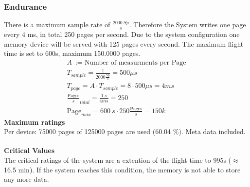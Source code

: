 \subsubsection{Endurance}
There is a maximum sample rate of $\frac{2000 ~Sp}{s}$. Therefore the System writes one page every 4 ms, in total 250 pages per second. Due to the system configuration one memory device will be served with 125 pages every second. The maximum flight time is set to 600s, maximum 150.0000 pages. 
\begin{equation}
	\begin{split}
		A ~:= \text{Number of measurments per Page} \\ 
		T_{sample} = \frac{1}{2000 \frac{Sp}{s}} = 500 \mu s \\ 
		T_{page} = A \cdot T_{sample} = 8 \cdot 500\mu s = 4 ms \\  
		\frac{\text{Pages}}{s}_{total} =  \frac{1~s}{4 ms} = 250 \\
		\text{Page}_{max} = 600~s \cdot 250 \frac{\text{Pages}}{s} = 150k
	\end{split}
\end{equation}
\textbf{Maximum ratings} \\ 
Per device: 75000 pages of 125000 pages are used (60.04 \%). Meta data included. \\  \\ 
\textbf{Critical Values} \\ 
The critical ratings of the system are a extention of the flight time to 995s ($\approx$ 16.5 min). If the system reaches this condition, the memory is not able to store any more data.  